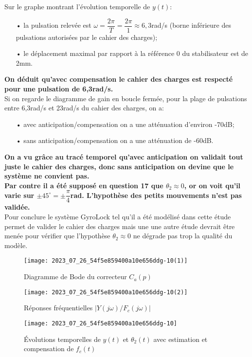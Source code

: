 \begin{corrige}
Sur le graphe montrant l'évolution temporelle de $y(t)$:
\begin{itemize}
\item[•] la pulsation relevée est $\omega = \dfrac{2\pi}{T} = \dfrac{2\pi}{1} \approx 6,3$rad/s (borne inférieure des pulsations autorisées par le cahier des charges);
\item[•] le déplacement maximal par rapport à la référence 0 du stabilisateur est de 2mm.
\end{itemize}

\textbf{On déduit qu'avec compensation le cahier des charges est respecté pour une pulsation de 6,3rad/s.}\\

Si on regarde le diagramme de gain en boucle fermée, pour la plage de pulsations entre 6,3rad/s et 23rad/s du cahier des charges, on a:

\begin{itemize}
\item[•] avec anticipation/compensation on a une atténuation d'environ -70dB;
\item[•] sans anticipation/compensation on a une atténuation de -60dB.
\end{itemize}

\textbf{On a vu grâce au tracé temporel qu'avec anticipation on validait tout juste le cahier des charges, donc sans anticipation on devine que le système ne convient pas.}\\

\textbf{Par contre il a été supposé en question 17 que $\theta_2 \approx 0$, or on voit qu'il varie sur $\pm 45^\circ = \pm \dfrac{\pi}{4}$rad. L'hypothèse des petits mouvements n'est pas validée.}\\

Pour conclure le système GyroLock tel qu'il a été modélisé dans cette étude permet de valider le cahier des charges mais une une autre étude devrait être menée pour vérifier que l'hypothèse $\theta_2 \approx 0$ ne dégrade pas trop la qualité du modèle.
\end{corrige}
\else
\fi

\begin{figure}[!h]
\centering
\texttt{[image: 2023\_07\_26\_54f5e859400a10e656ddg-10(1)]}
\caption{\label{fig_ccspsi2022:16}Diagramme de Bode du correcteur $C_{a}(p)$}
\end{figure}


\begin{figure}[!h]
\centering
\texttt{[image: 2023\_07\_26\_54f5e859400a10e656ddg-10(2)]}
\caption{\label{fig_ccspsi2022:17}Réponses fréquentielles $\left|Y(j \omega) / F_{c}(j \omega)\right|$}
\end{figure}


\begin{figure}[!h]
\centering
\texttt{[image: 2023\_07\_26\_54f5e859400a10e656ddg-10]}
\caption{\label{fig_ccspsi2022:18}Évolutions temporelles de $y(t)$ et $\theta_{2}(t)$ avec estimation et compensation de $f_{c}(t)$}
\end{figure}

%